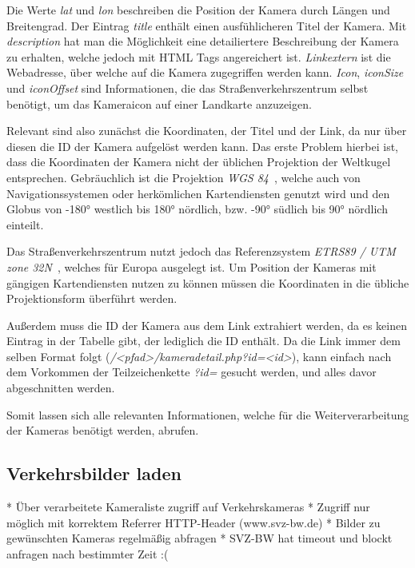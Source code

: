 Die Werte {\em lat} und {\em lon} beschreiben die Position der Kamera durch Längen und Breitengrad.
Der Eintrag {\em title} enthält einen ausfühlicheren Titel der Kamera. Mit {\em description} hat man die Möglichkeit eine detailiertere Beschreibung der Kamera zu erhalten, welche jedoch mit HTML Tags angereichert ist. {\em Linkextern} ist die Webadresse, über welche auf die Kamera zugegriffen werden kann. {\em Icon}, {\em iconSize} und {\em iconOffset} sind Informationen, die das Straßenverkehrszentrum selbst benötigt, um das Kameraicon auf einer Landkarte anzuzeigen.

Relevant sind also zunächst die Koordinaten, der Titel und der Link, da nur über diesen die ID der Kamera aufgelöst werden kann.
Das erste Problem hierbei ist, dass die Koordinaten der Kamera nicht der üblichen Projektion der Weltkugel entsprechen. Gebräuchlich ist die Projektion {\em WGS 84}~\cite{wgs84}, welche auch von Navigationssystemen oder herkömlichen Kartendiensten genutzt wird und den Globus von -180° westlich bis 180° nördlich, bzw. -90° südlich bis 90° nördlich einteilt.

Das Straßenverkehrszentrum nutzt jedoch das Referenzsystem {\em ETRS89 / UTM zone 32N}~\cite{etrs89}, welches für Europa ausgelegt ist.
Um Position der Kameras mit gängigen Kartendiensten nutzen zu können müssen die Koordinaten in die übliche Projektionsform überführt werden.

Außerdem muss die ID der Kamera aus dem Link extrahiert werden, da es keinen Eintrag in der Tabelle gibt, der lediglich die ID enthält.
Da die Link immer dem selben Format folgt ({\em /<pfad>/kameradetail.php?id=<id>}), kann einfach nach dem Vorkommen der Teilzeichenkette {\em ?id=} gesucht werden, und alles davor abgeschnitten werden.

Somit lassen sich alle relevanten Informationen, welche für die Weiterverarbeitung der Kameras benötigt werden, abrufen.

\subsection{Verkehrsbilder laden}
* Über verarbeitete Kameraliste zugriff auf Verkehrskameras\newline
* Zugriff nur möglich mit korrektem Referrer HTTP-Header (www.svz-bw.de)\newline
* Bilder zu gewünschten Kameras regelmäßig abfragen\newline
* SVZ-BW hat timeout und blockt anfragen nach bestimmter Zeit :(\newline

